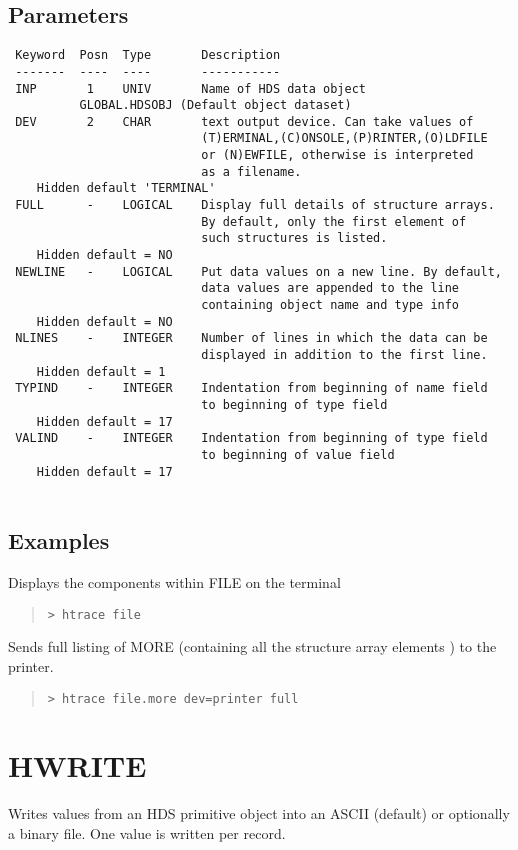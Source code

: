 \documentclass{book}
\renewcommand{\_}{{\tt\char'137}}     %
\begin{document}
\subsection{Parameters}
\begin{verbatim}
 Keyword  Posn  Type       Description
 -------  ----  ----       -----------
 INP       1    UNIV       Name of HDS data object
          GLOBAL.HDSOBJ (Default object dataset)
 DEV       2    CHAR       text output device. Can take values of
                           (T)ERMINAL,(C)ONSOLE,(P)RINTER,(O)LDFILE
                           or (N)EWFILE, otherwise is interpreted
                           as a filename.
    Hidden default 'TERMINAL'
 FULL      -    LOGICAL    Display full details of structure arrays.
                           By default, only the first element of
                           such structures is listed.
    Hidden default = NO
 NEWLINE   -    LOGICAL    Put data values on a new line. By default,
                           data values are appended to the line
                           containing object name and type info
    Hidden default = NO
 NLINES    -    INTEGER    Number of lines in which the data can be
                           displayed in addition to the first line.
    Hidden default = 1
 TYPIND    -    INTEGER    Indentation from beginning of name field
                           to beginning of type field
    Hidden default = 17
 VALIND    -    INTEGER    Indentation from beginning of type field
                           to beginning of value field
    Hidden default = 17
 
\end{verbatim}\subsection{Examples}
Displays the components within FILE on the terminal
\begin{quote}\begin{verbatim}
> htrace file
\end{verbatim}\end{quote}
Sends full listing of MORE (containing all the
structure array elements ) to the printer.
\begin{quote}\begin{verbatim}
> htrace file.more dev=printer full
\end{verbatim}\end{quote}
\section{HWRITE}
Writes values from an HDS primitive object into an ASCII
(default) or optionally a binary file. One value is written per
record.
 
\end{document}
